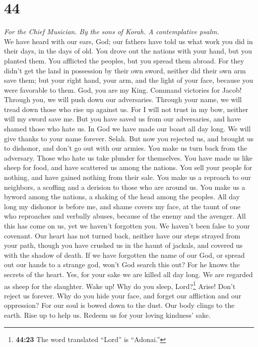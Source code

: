 \hypertarget{section-43}{%
\section{44}\label{section-43}}

\emph{For the Chief Musician. By the sons of Korah. A contemplative
psalm.}\\
 We have heard with our ears, God; our fathers have told
us what work you did in their days, in the days of old. 
You drove out the nations with your hand, but you planted them. You
afflicted the peoples, but you spread them abroad.  For
they didn't get the land in possession by their own sword, neither did
their own arm save them; but your right hand, your arm, and the light of
your face, because you were favorable to them.  God, you
are my King. Command victories for Jacob!  Through you, we
will push down our adversaries. Through your name, we will tread down
those who rise up against us.  For I will not trust in my
bow, neither will my sword save me.  But you have saved us
from our adversaries, and have shamed those who hate us. 
In God we have made our boast all day long. We will give thanks to your
name forever. Selah.  But now you rejected us, and brought
us to dishonor, and don't go out with our armies.  You
make us turn back from the adversary. Those who hate us take plunder for
themselves.  You have made us like sheep for food, and
have scattered us among the nations.  You sell your
people for nothing, and have gained nothing from their sale.
 You make us a reproach to our neighbors, a scoffing and
a derision to those who are around us.  You make us a
byword among the nations, a shaking of the head among the peoples.
 All day long my dishonor is before me, and shame covers
my face,  at the taunt of one who reproaches and verbally
abuses, because of the enemy and the avenger.  All this
has come on us, yet we haven't forgotten you. We haven't been false to
your covenant.  Our heart has not turned back, neither
have our steps strayed from your path,  though you have
crushed us in the haunt of jackals, and covered us with the shadow of
death.  If we have forgotten the name of our God, or
spread out our hands to a strange god,  won't God search
this out? For he knows the secrets of the heart.  Yes,
for your sake we are killed all day long. We are regarded as sheep for
the slaughter.  Wake up! Why do you sleep,
Lord?\footnote{\textbf{44:23} The word translated ``Lord'' is
  ``Adonai.''} Arise! Don't reject us forever.  Why do
you hide your face, and forget our affliction and our oppression?
 For our soul is bowed down to the dust. Our body clings
to the earth.  Rise up to help us. Redeem us for your
loving kindness' sake.

